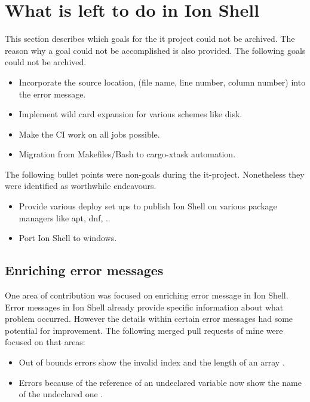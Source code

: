 \clearpage

\section{What is left to do in Ion Shell}

This section describes which goals for the it project could not be archived.
The reason why a goal could not be accomplished is also provided.
The following goals could not be archived.
\begin{itemize}
	\item Incorporate the source location, (file name, line number, column number) into the error message.
	\item Implement wild card expansion for various schemes like disk.
	\item Make the CI work on all jobs possible.
	\item Migration from Makefiles/Bash to cargo-xtask automation.
\end{itemize}

The following bullet points were non-goals during the it-project.
Nonetheless they were identified as worthwhile endeavours.

\begin{itemize}
	\item Provide various deploy set ups to publish Ion Shell on various package managers like apt, dnf, ..
	\item Port Ion Shell to windows.
\end{itemize}

\subsection{Enriching error messages}

One area of contribution was focused on enriching error message in Ion Shell.
Error messages in Ion Shell already provide specific information about what problem occurred.
However the details within certain error messages had some potential for improvement.
The following merged pull requests of mine were focused on that areas:

\begin{itemize}
	\item Out of bounds errors show the invalid index and the length of an array \cite{pr_error_message_shows_invalid_range}.
	\item Errors because of the reference of an undeclared variable now show the name of the undeclared one \cite{pr_better_not_found_variable_show}.
\end{itemize}

